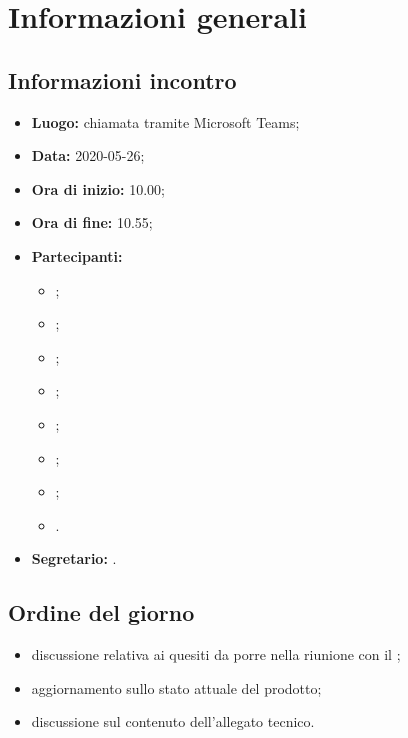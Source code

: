 \section{Informazioni generali}
\subsection{Informazioni incontro}
\begin{itemize}
	\item \textbf{Luogo:} chiamata tramite Microsoft Teams;
	\item \textbf{Data:} 2020-05-26;
	\item \textbf{Ora di inizio:} 10.00;
	\item \textbf{Ora di fine:} 10.55;
	\item \textbf{Partecipanti:}
		\begin{itemize}
			\item \VB;
			\item \LB;
			\item \NF;
			\item \EG;
			\item \FJ;
			\item \MP;
			\item \AS;
			\item \AZ.
		\end{itemize}
	\item \textbf{Segretario:} \MP.
\end{itemize}

\subsection{Ordine del giorno}
\begin{itemize}
	\item discussione relativa ai quesiti da porre nella riunione con il \TV ;
	\item aggiornamento sullo stato attuale del prodotto;
	\item discussione sul contenuto dell'allegato tecnico.
\end{itemize}
